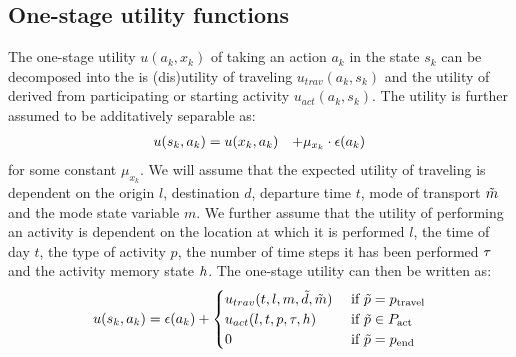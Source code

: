 \subsection{One-stage utility functions}
The one-stage utility $u(a_k,x_k)$ of taking an action $a_k$ in the state $s_k$ can be decomposed into the is (dis)utility of traveling $u_{trav}(a_k,s_k)$ and the utility of derived from participating or starting activity $u_{act}(a_k,s_k)$. The utility is further assumed to be additatively separable as:
\begin{equation}
\begin{aligned}
	\avgu(s_k,a_k)& =\avgu(x_k,a_k) &+ \mu_{x_k}\cdot\epsilon(a_k)\\
\end{aligned}
\end{equation}
for some constant $\mu_{x_k}$. We will assume that the expected utility of traveling is dependent on the origin $l$, destination $d$, departure time $t$, mode of transport $\tilde{m}$ and the mode state variable $m$. We further assume that the utility of performing an activity is dependent on the location at which it is performed $l$, the time of day $t$, the type of activity $p$, the number of time steps it has been performed $\tau$ and the activity memory state $h$. The one-stage utility can then be written as:
\begin{equation}
	\avgu(s_k,a_k) = \epsilon(a_k) + \begin{cases}
	\avgu_{trav}(t,l,m,\act{d},\act{m}) &\cif \act{p} = p_\text{travel} \\
	\avgu_{act}(l,t,p,\atime,\amem) & \cif \act{p} \in P_{\text{act}} \\
	0 & \cif \act{p} = p_\text{end}
	\end{cases}
\end{equation}

%
